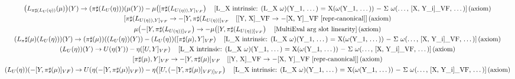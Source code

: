 \documentclass[11pt]{article}
\begin{document}
{\begin{gather*}
\left(L_{\pi\sharp(L_U(\eta))}\!\left(\mu\right)\right)\!\left(Y\right) \to \left(\pi\sharp\!\left(L_U\!\left(\eta\right)\right)\right)\!\left(\mu\!\left(Y\right)\right) - \mu\!\left([\pi\sharp(L_{U(\eta)),Y]_{VF}}\right) \quad \text{[L\_X intrinsic: (L\_X \ensuremath{\omega})(Y\_1, \ensuremath{\dots}) = X(\ensuremath{\omega}(Y\_1, \ensuremath{\dots})) \ensuremath{-} \ensuremath{\Sigma} \ensuremath{\omega}(\ensuremath{\dots}, [X, Y\_i]\_VF, \ensuremath{\dots})]\,(axiom)} \\
[\pi\sharp(L_{U(\eta)),Y]_{VF}} \to -[Y,\pi\sharp(L_{U(\eta))]_{VF}} \quad \text{[[Y, X]\_VF \ensuremath{\to} \ensuremath{-}[X, Y]\_VF  [repr-canonical]]\,(axiom)} \\
\mu\!\left(-[Y,\pi\sharp(L_{U(\eta))]_{VF}}\right) \to -\mu\!\left([Y,\pi\sharp(L_{U(\eta))]_{VF}}\right) \quad \text{[MultiEval arg slot linearity]\,(axiom)} \\
\left(L_\pi\sharp(\mu)\!\left(L_U\!\left(\eta\right)\right)\right)\!\left(Y\right) \to \left(\pi\sharp\!\left(\mu\right)\right)\!\left(\left(L_U\!\left(\eta\right)\right)\!\left(Y\right)\right) - \left(L_U\!\left(\eta\right)\right)\!\left([\pi\sharp(\mu),Y]_{VF}\right) \quad \text{[L\_X intrinsic: (L\_X \ensuremath{\omega})(Y\_1, \ensuremath{\dots}) = X(\ensuremath{\omega}(Y\_1, \ensuremath{\dots})) \ensuremath{-} \ensuremath{\Sigma} \ensuremath{\omega}(\ensuremath{\dots}, [X, Y\_i]\_VF, \ensuremath{\dots})]\,(axiom)} \\
\left(L_U\!\left(\eta\right)\right)\!\left(Y\right) \to U\!\left(\eta\!\left(Y\right)\right) - \eta\!\left([U,Y]_{VF}\right) \quad \text{[L\_X intrinsic: (L\_X \ensuremath{\omega})(Y\_1, \ensuremath{\dots}) = X(\ensuremath{\omega}(Y\_1, \ensuremath{\dots})) \ensuremath{-} \ensuremath{\Sigma} \ensuremath{\omega}(\ensuremath{\dots}, [X, Y\_i]\_VF, \ensuremath{\dots})]\,(axiom)} \\
[\pi\sharp(\mu),Y]_{VF} \to -[Y,\pi\sharp(\mu)]_{VF} \quad \text{[[Y, X]\_VF \ensuremath{\to} \ensuremath{-}[X, Y]\_VF  [repr-canonical]]\,(axiom)} \\
\left(L_U\!\left(\eta\right)\right)\!\left(-[Y,\pi\sharp(\mu)]_{VF}\right) \to U\!\left(\eta\!\left(-[Y,\pi\sharp(\mu)]_{VF}\right)\right) - \eta\!\left([U,(-[Y,\pi\sharp(\mu)]_{VF)]_{VF}}\right) \quad \text{[L\_X intrinsic: (L\_X \ensuremath{\omega})(Y\_1, \ensuremath{\dots}) = X(\ensuremath{\omega}(Y\_1, \ensuremath{\dots})) \ensuremath{-} \ensuremath{\Sigma} \ensuremath{\omega}(\ensuremath{\dots}, [X, Y\_i]\_VF, \ensuremath{\dots})]\,(axiom)} \\

\end{gather*}}
\end{document}
